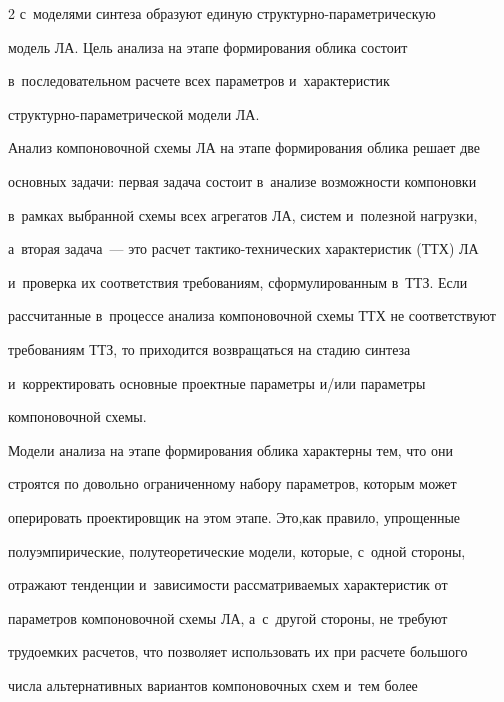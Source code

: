 \begin{multicols}{2}
с~моделями синтеза образуют единую струк\-тур\-но-па\-ра\-мет\-ри\-че\-скую 


модель ЛА. Цель анализа на этапе формирования облика со\-сто\-ит 


в~последовательном расчете всех па\-ра\-мет\-ров и~характеристик  


струк\-тур\-но-па\-ра\-мет\-ри\-че\-ской модели ЛА.





  


  Анализ компоновочной схемы ЛА на этапе формирования облика решает две 


основных задачи: пер\-вая задача состоит в~анализе возможности компоновки 


в~рамках выбранной схемы всех агрегатов ЛА, сис\-тем и~полезной нагрузки, 


а~вторая задача~--- это рас\-чет так\-ти\-ко-тех\-ни\-че\-ских характеристик (ТТХ) ЛА 


и~проверка их соответствия требованиям, сформулированным в~ТТЗ. Если 


\mbox{рассчитанные} в~процессе анализа компоновочной схемы ТТХ не соответствуют 


требованиям ТТЗ, то приходится возвращаться на стадию синтеза 


и~корректировать основные проектные па\-ра\-мет\-ры и/или па\-ра\-мет\-ры 


компоновочной схемы. 


  


  Модели анализа на этапе формирования облика характерны тем, что они 


строятся по довольно ограниченному набору параметров, которым  может 


оперировать проектировщик на этом этапе. Это,\linebreak как правило, упрощенные 


полуэмпирические, \mbox{полутеоретические} модели, которые, с~одной стороны, 


отражают тенденции и~за\-ви\-си\-мости рас\-смат\-ри\-ва\-емых характеристик от 


па\-ра\-мет\-ров компоновочной схемы ЛА, а~с~другой стороны, не требуют 


тру\-до\-емких расчетов, что поз\-во\-ля\-ет использовать их при расчете большого 


чис\-ла альтернативных вариантов компоновочных схем и~тем более 



\end{multicols}

